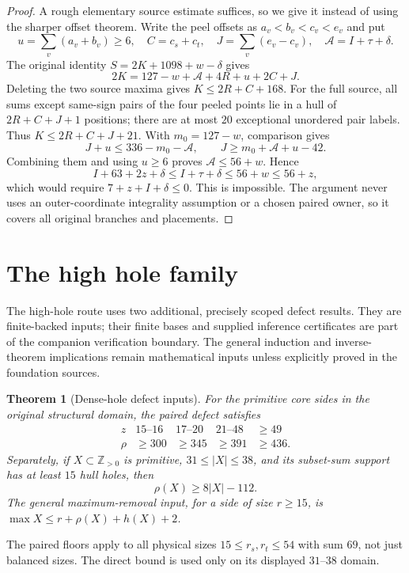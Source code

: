 \documentclass[11pt,letterpaper]{article}
\newcommand{\Z}{\mathbb Z}\newcommand{\R}{\mathbb R}
\newcommand{\card}[1]{\lvert#1\rvert}
\newtheorem{theorem}{Theorem}[section]
\theoremstyle{definition}\newtheorem{definition}[theorem]{Definition}
\begin{document}
\begin{proof}
A rough elementary source estimate suffices, so we give it instead of using the sharper offset theorem. Write the peel offsets as $a_v<b_v<c_v<e_v$ and put
\[
u=\sum_v(a_v+b_v)\ge6,\quad C=c_s+c_t,\quad
J=\sum_v(e_v-c_v),\quad\mathcal A=I+\tau+\delta.
\]
The original identity $S=2K+1098+w-\delta$ gives
\[
2K=127-w+\mathcal A+4R+u+2C+J.
\]
Deleting the two source maxima gives $K\le2R+C+168$. For the full source, all sums except same-sign pairs of the four peeled points lie in a hull of $2R+C+J+1$ positions; there are at most $20$ exceptional unordered pair labels. Thus $K\le2R+C+J+21$. With $m_0=127-w$, comparison gives
\[
J+u\le336-m_0-\mathcal A,\qquad
J\ge m_0+\mathcal A+u-42.
\]
Combining them and using $u\ge6$ proves $\mathcal A\le56+w$. Hence
\[
I+63+2z+\delta\le I+\tau+\delta\le56+w\le56+z,
\]
which would require $7+z+I+\delta\le0$. This is impossible. The argument never uses an outer-coordinate integrality assumption or a chosen paired owner, so it covers all original branches and placements.
\end{proof}


\section{The high hole family}\label{sec:h}
The high-hole route uses two additional, precisely scoped defect results. They are finite-backed inputs; their finite bases and supplied inference certificates are part of the companion verification boundary. The general induction and inverse-theorem implications remain mathematical inputs unless explicitly proved in the foundation sources.

\begin{theorem}[Dense-hole defect inputs]\label{thm:dense-input}
For the primitive core sides in the original structural domain, the paired defect satisfies
\[
\begin{array}{c|cccc}
z&15\text{--}16&17\text{--}20&21\text{--}48&\ge49\\\hline
\rho&\ge300&\ge345&\ge391&\ge436.
\end{array}
\]
Separately, if $X\subset\Z_{>0}$ is primitive, $31\le\card X\le38$, and its subset-sum support has at least $15$ hull holes, then
\[
\rho(X)\ge8\card X-112.
\]
The general maximum-removal input, for a side of size $r\ge15$, is
$\max X\le r+\rho(X)+h(X)+2$.
\end{theorem}
The paired floors apply to all physical sizes $15\le r_s,r_t\le54$ with sum $69$, not just balanced sizes. The direct bound is used only on its displayed $31$--$38$ domain.
\end{document}
